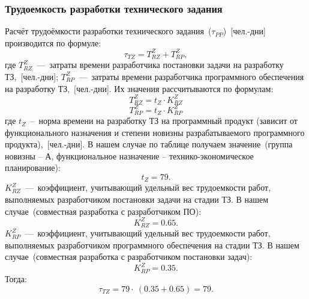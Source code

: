         \subsubsection{Трудоемкость разработки технического задания}
            Расчёт трудоёмкости разработки технического задания~($\tau_{PP}$)~[чел.-дни] производится по формуле:
            $$\tau_{TZ} = T^Z_{RZ} + T^Z_{RP},$$
            где $T^Z_{RZ}$~---~затраты времени разработчика постановки задачи на разработку ТЗ,~[чел.-дни];
            $T^Z_{RP}$~---~затраты времени разработчика программного обеспечения на разработку ТЗ,~[чел.-дни].
            Их значения рассчитываются по формулам:
            \begin{equation}
                T^Z_{RZ} = t_Z \cdot  K^Z_{RZ}   \nonumber
            \end{equation}
            \begin{equation}
                T^Z_{RP} = t_Z \cdot  K^Z_{RP}   \nonumber
            \end{equation}
            где $t_Z$~--~норма времени на разработку ТЗ на программный продукт
            (зависит от функционального назначения и степени новизны разрабатываемого
            программного продукта),~[чел.-дни].
            В нашем случае по таблице получаем значение~(группа новизны – А, функциональное назначение – технико-экономическое планирование):
            $$t_Z = 79.$$
            $K^Z_{RZ}$~---~коэффициент, учитывающий удельный вес трудоемкости работ,
            выполняемых разработчиком постановки задачи на стадии ТЗ.
            В нашем случае~(совместная разработка с разработчиком ПО):
            $$K^Z_{RZ} = 0.65.$$
            $K^Z_{RP}$~---~коэффициент, учитывающий удельный вес трудоемкости работ,
            выполняемых разработчиком программного обеспечения на стадии ТЗ.
            В нашем случае~(совместная разработка с разработчиком постановки задач):
            $$K^Z_{RP} = 0.35.$$
            Тогда:
            $$\tau_{TZ} = 79 \cdot ~(0.35 + 0.65) = 79.$$

